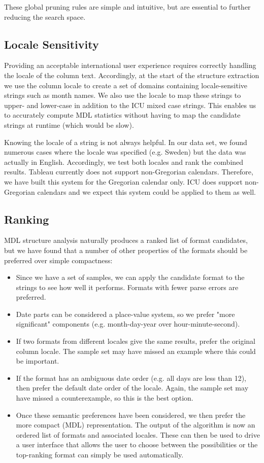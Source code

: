 These global pruning rules are simple and intuitive, but are essential to further reducing the search space.

\subsection{Locale Sensitivity}
Providing an acceptable international user experience requires correctly handling the locale of the column text. Accordingly, at the start of the structure extraction we use the column locale to create a set of domains containing locale-sensitive strings such as month names. We also use the locale to map these strings to upper- and lower-case in addition to the ICU mixed case strings. This enables us to accurately compute MDL statistics without having to map the candidate strings at runtime (which would be slow).

Knowing the locale of a string is not always helpful. In our data set, we found numerous cases where the locale was specified (e.g. Sweden) but the data was actually in English. Accordingly, we test both locales and rank the combined results.
Tableau currently does not support non-Gregorian calendars. Therefore, we have built this system for the Gregorian calendar only. ICU does support non-Gregorian calendars and we expect this system could be applied to them as well.

\subsection{Ranking}
MDL structure analysis naturally produces a ranked list of format candidates, but we have found that a number of other properties of the formats should be preferred over simple compactness:
\begin{itemize}
\item Since we have a set of samples, we can apply the candidate format to the strings to see how well it performs. Formats with fewer parse errors are preferred.
\item Date parts can be considered a place-value system, so we prefer "more significant" components (e.g. month-day-year over hour-minute-second).
\item If two formats from different locales give the same results, prefer the original column locale. The sample set may have missed an example where this could be important.
\item If the format has an ambiguous date order (e.g. all days are less than 12), then prefer the default date order of the locale. Again, the sample set may have missed a counterexample, so this is the best option.
\item Once these semantic preferences have been considered, we then prefer the more compact (MDL) representation.
The output of the algorithm is now an ordered list of formats and associated locales. These can then be used to drive a user interface that allows the user to choose between the possibilities or the top-ranking format can simply be used automatically.
\end{itemize}